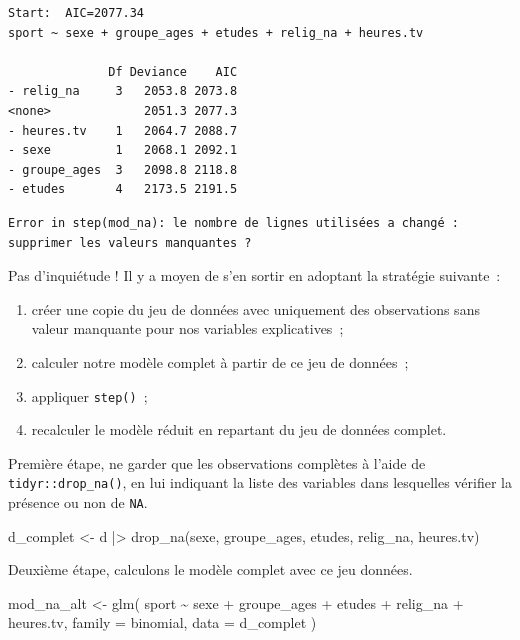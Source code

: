 \documentclass[
  letterpaper,
  DIV=11,
  numbers=noendperiod,
  oneside]{scrreprt}
\newenvironment{Shaded}{\begin{snugshade}}{\end{snugshade}}
\newcommand{\AttributeTok}[1]{\textcolor[rgb]{0.40,0.45,0.13}{#1}}
\newcommand{\FunctionTok}[1]{\textcolor[rgb]{0.28,0.35,0.67}{#1}}
\newcommand{\NormalTok}[1]{\textcolor[rgb]{0.00,0.23,0.31}{#1}}
\newcommand{\OtherTok}[1]{\textcolor[rgb]{0.00,0.23,0.31}{#1}}
\newcommand{\SpecialCharTok}[1]{\textcolor[rgb]{0.37,0.37,0.37}{#1}}
\begin{document}
\begin{tcolorbox}
\begin{verbatim}
Start:  AIC=2077.34
sport ~ sexe + groupe_ages + etudes + relig_na + heures.tv

              Df Deviance    AIC
- relig_na     3   2053.8 2073.8
<none>             2051.3 2077.3
- heures.tv    1   2064.7 2088.7
- sexe         1   2068.1 2092.1
- groupe_ages  3   2098.8 2118.8
- etudes       4   2173.5 2191.5
\end{verbatim}

\begin{verbatim}
Error in step(mod_na): le nombre de lignes utilisées a changé : supprimer les valeurs manquantes ?
\end{verbatim}

Pas d'inquiétude ! Il y a moyen de s'en sortir en adoptant la stratégie
suivante~:

\begin{enumerate}
\def\labelenumi{\arabic{enumi}.}
\item
  créer une copie du jeu de données avec uniquement des observations
  sans valeur manquante pour nos variables explicatives~;
\item
  calculer notre modèle complet à partir de ce jeu de données~;
\item
  appliquer \texttt{step()}~;
\item
  recalculer le modèle réduit en repartant du jeu de données complet.
\end{enumerate}

Première étape, ne garder que les observations complètes à l'aide de
\texttt{tidyr::drop\_na()}, en lui indiquant la liste des variables dans
lesquelles vérifier la présence ou non de \texttt{NA}.

\begin{Shaded}
\begin{Highlighting}[]
\NormalTok{d\_complet }\OtherTok{\textless{}{-}}\NormalTok{ d }\SpecialCharTok{|\textgreater{}} 
  \FunctionTok{drop\_na}\NormalTok{(sexe, groupe\_ages, etudes, relig\_na, heures.tv)}
\end{Highlighting}
\end{Shaded}

Deuxième étape, calculons le modèle complet avec ce jeu données.

\begin{Shaded}
\begin{Highlighting}[]
\NormalTok{mod\_na\_alt }\OtherTok{\textless{}{-}} \FunctionTok{glm}\NormalTok{(}
\NormalTok{  sport }\SpecialCharTok{\textasciitilde{}}\NormalTok{ sexe }\SpecialCharTok{+}\NormalTok{ groupe\_ages }\SpecialCharTok{+}\NormalTok{ etudes }\SpecialCharTok{+}\NormalTok{ relig\_na }\SpecialCharTok{+}\NormalTok{ heures.tv,}
  \AttributeTok{family =}\NormalTok{ binomial,}
  \AttributeTok{data =}\NormalTok{ d\_complet}
\NormalTok{)}
\end{Highlighting}
\end{Shaded}


\end{tcolorbox}
\end{document}
